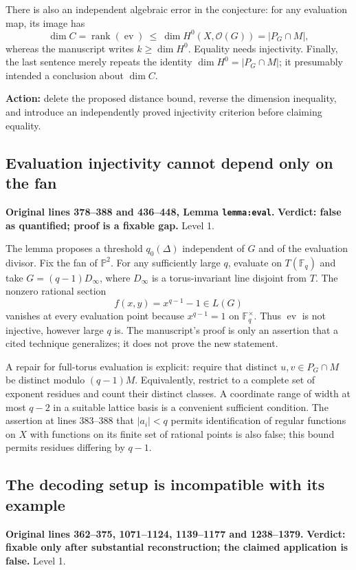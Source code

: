 \documentclass[12pt,letterpaper]{article}
\DeclareMathOperator{\ev}{ev}
\newcommand{\F}{\mathbb F}
\newcommand{\PP}{\mathbb P}
\newcommand{\OO}{\mathcal O}
\newcommand{\err}[1]{\textbf{#1}}
\newcommand{\level}[1]{\textsf{Level #1}}
\begin{document}
There is also an independent algebraic error in the conjecture: for any evaluation map, its image has
\[
\dim C=\operatorname{rank}(\ev)\ \le\ \dim H^0(X,\OO(G))=|P_G\cap M|,
\]
whereas the manuscript writes $k\ge\dim H^0$.  Equality needs injectivity.  Finally, the last sentence merely repeats the identity $\dim H^0=|P_G\cap M|$; it presumably intended a conclusion about $\dim C$.

\textbf{Action:} delete the proposed distance bound, reverse the dimension inequality, and introduce an independently proved injectivity criterion before claiming equality.

\subsection{Evaluation injectivity cannot depend only on the fan}\label{sec:inject}
\textbf{Original lines 378--388 and 436--448, Lemma \texttt{lemma:eval}.}\quad
\err{Verdict: false as quantified; proof is a fixable gap.} \level{1}.

The lemma proposes a threshold $q_0(\Delta)$ independent of $G$ and of the evaluation divisor.  Fix the fan of $\PP^2$.  For any sufficiently large $q$, evaluate on $T(\F_q)$ and take $G=(q-1)D_\infty$, where $D_\infty$ is a torus-invariant line disjoint from $T$.  The nonzero rational section
\[
f(x,y)=x^{q-1}-1\in L(G)
\]
vanishes at every evaluation point because $x^{q-1}=1$ on $\F_q^\times$.  Thus $\ev$ is not injective, however large $q$ is.  The manuscript's proof is only an assertion that a cited technique generalizes; it does not prove the new statement.

A repair for full-torus evaluation is explicit: require that distinct $u,v\in P_G\cap M$ be distinct modulo $(q-1)M$.  Equivalently, restrict to a complete set of exponent residues and count their distinct classes.  A coordinate range of width at most $q-2$ in a suitable lattice basis is a convenient sufficient condition.  The assertion at lines 383--388 that $|a_i|<q$ permits identification of regular functions on $X$ with functions on its finite set of rational points is also false; this bound permits residues differing by $q-1$.

\subsection{The decoding setup is incompatible with its example}\label{sec:decode}
\textbf{Original lines 362--375, 1071--1124, 1139--1177 and 1238--1379.}\quad
\err{Verdict: fixable only after substantial reconstruction; the claimed application is false.} \level{1}.
\end{document}
